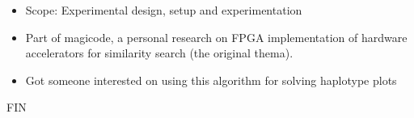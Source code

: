 \documentclass{beamer}
\begin{document}
\begin{frame}
\begin{itemize}
    \item Scope: Experimental design, setup and experimentation
    \item Part of magicode, a personal research on FPGA implementation of hardware accelerators for similarity search (the original thema).
    \item Got someone interested on using this algorithm for solving haplotype plots
\end{itemize}
\end{frame}
  
\begin{frame}
\centering
		FIN
\end{frame}
\end{document}
